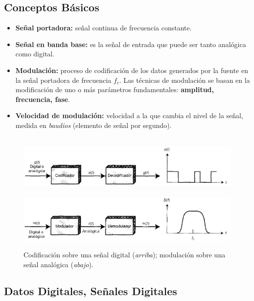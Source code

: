 \documentclass[10pt,a4paper]{article}
\begin{document}
\subsection{Conceptos Básicos}
\begin{itemize}
\item \textbf{Señal portadora:} señal continua de frecuencia constante.
\item \textbf{Señal en banda base:} es la señal de entrada que puede ser tanto analógica como digital.
\item \textbf{Modulación:} proceso de codificación de los datos generados por la fuente en la señal portadora de frecuencia $f_c$. Las técnicas de modulación se basan en la modificación de uno o más parámetros fundamentales: \textbf{amplitud, frecuencia, fase}.
\item \textbf{Velocidad de modulación:} velocidad a la que cambia el nivel de la señal, medida en \textit{baudios} (elemento de señal por segundo).
\end{itemize}

\begin{figure}[ht!]
  \caption{Codificación sobre una señal digital (\textit{arriba}); modulación sobre una señal analógica (\textit{abajo}).}
  \label{fig:tecnicas}  
  \centering
  \hbox{
	\includegraphics[width=\textwidth-\fboxrule-\fboxrule]{imgs/tecnicas_up.jpg}}
  \hbox{
	\includegraphics[width=\textwidth-\fboxrule-\fboxrule]{imgs/tecnicas_down.jpg}}	
\end{figure}

\subsection{Datos Digitales, Señales Digitales}
\end{document}
